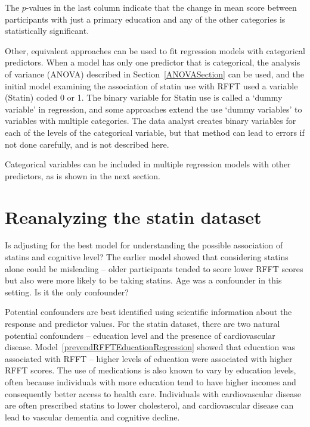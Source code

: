 The $p$-values in the last column indicate that the change in mean score between participants with just a primary education and any of the other categories is statistically significant.

Other, equivalent approaches can be used to fit regression models with categorical predictors. When a model has only one predictor that is categorical, the analysis of variance (ANOVA) described in Section~\ref{ANOVASection} can be used, and the initial model examining the association of statin use with RFFT used a variable (Statin) coded 0 or 1. The binary variable for Statin use is called a `dummy variable' in regression, and some approaches extend the use `dummy variables' to variables with multiple categories.  The data analyst creates binary variables for each of the levels of the categorical variable, but that method can lead to errors if not done carefully, and is not described here.

Categorical variables can be included in multiple regression models with other predictors, as is shown in the next section.

\section{Reanalyzing the statin dataset}
\label{reanalyzingStatinDataSet}

Is adjusting for  the best model for understanding the possible association of statins and cognitive level?  The earlier model showed that considering statins alone could be misleading -- older participants tended to score lower RFFT scores but also were more likely to be taking statins.  Age was a confounder in this setting.  Is it the only confounder?

Potential confounders are best identified using scientific information about the response and predictor values.  For the statin dataset, there are two natural potential confounders -- education level and the presence of cardiovascular disease. Model~\ref{prevendRFFTEducationRegression} showed that education was associated with RFFT -- higher levels of education were associated with higher RFFT scores.  The use of medications is also known to vary by education levels, often because individuals with more education tend to have higher incomes and consequently better access to health care.  Individuals with cardiovascular disease are often prescribed statins to lower cholesterol, and cardiovascular disease can lead to vascular dementia and cognitive decline.  


